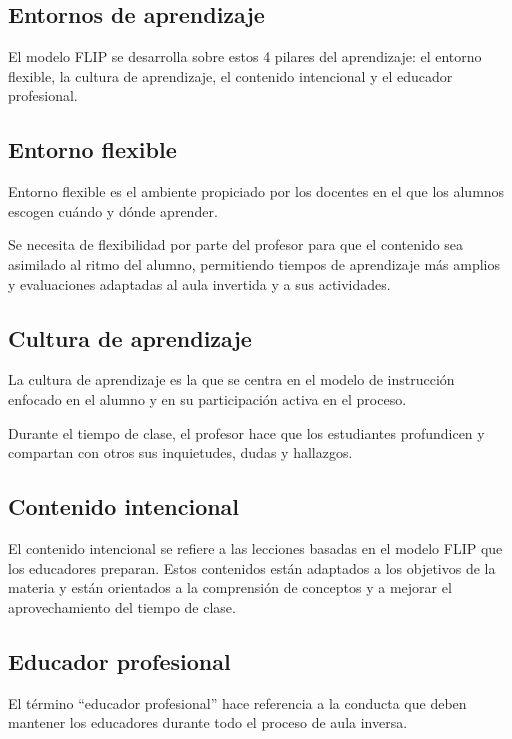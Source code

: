 \documentclass[oneside,spanish]{amsart}
\numberwithin{equation}{section}
\numberwithin{figure}{section}
\theoremstyle{definition}
\begin{document}
\subsection{Entornos de aprendizaje}

El modelo FLIP se desarrolla sobre estos 4 pilares del aprendizaje: el entorno flexible, la cultura de aprendizaje, el contenido intencional y el educador profesional.

\subsection{Entorno flexible}

Entorno flexible es el ambiente propiciado por los docentes en el que los alumnos escogen cuándo y dónde aprender.

Se necesita de flexibilidad por parte del profesor para que el contenido sea asimilado al ritmo del alumno, permitiendo tiempos de aprendizaje más amplios y evaluaciones adaptadas al aula invertida y a sus actividades.

\subsection{Cultura de aprendizaje}

La cultura de aprendizaje es la que se centra en el modelo de instrucción enfocado en el alumno y en su participación activa en el proceso.

Durante el tiempo de clase, el profesor hace que los estudiantes profundicen y compartan con otros sus inquietudes, dudas y hallazgos.

\subsection{Contenido intencional}

El contenido intencional se refiere a las lecciones basadas en el modelo FLIP que los educadores preparan. Estos contenidos están adaptados a los objetivos de la materia y están orientados a la comprensión de conceptos y a mejorar el aprovechamiento del tiempo de clase.

\subsection{Educador profesional}

El término “educador profesional” hace referencia a la conducta que deben mantener los educadores durante todo el proceso de aula inversa.
\end{document}
